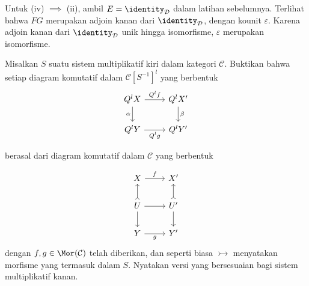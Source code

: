 \begin{Exercises}
\begin{hint}
		Untuk (iv) $\implies$ (ii), ambil
		$E=\identity_{\mathcal{D}}$ dalam latihan sebelumnya. Terlihat bahwa
		$FG$ merupakan adjoin kanan dari $\identity_{\mathcal{D}}$, dengan
		kounit $\varepsilon$. Karena adjoin kanan dari
		$\identity_{\mathcal{D}}$ unik hingga isomorfisme, $\varepsilon$
		merupakan isomorfisme.
	\end{hint}

	\item Misalkan $S$ suatu sistem multiplikatif kiri dalam kategori
	$\mathcal{C}$. Buktikan bahwa setiap diagram komutatif dalam
	$\mathcal{C}[S^{-1}]^l$ yang berbentuk
	\[\begin{tikzcd}
		Q^l X \arrow[r, "{Q^l f}"] \arrow[d, "\alpha"'] & Q^l X' \arrow[d, "\beta"] \\
		Q^l Y \arrow[r, "{Q^l g}"'] & Q^l Y'
	\end{tikzcd}\]
	\begin{center}
		berasal dari diagram komutatif dalam $\mathcal{C}$ yang berbentuk
	\end{center}
	\[\begin{tikzcd}
		X \arrow[r, "f"] & X' \\
		U \arrow[r] \arrow[rightarrowtail, u] \arrow[d] & U' \arrow[rightarrowtail, u] \arrow[d] \\
		Y \arrow[r, "g"'] & Y'
	\end{tikzcd}\]
	dengan $f,g\in\Mor(\mathcal{C})$ telah diberikan, dan seperti biasa
	$\rightarrowtail$ menyatakan morfisme yang termasuk dalam $S$. Nyatakan
	versi yang bersesuaian bagi sistem multiplikatif kanan.


\end{Exercises}
